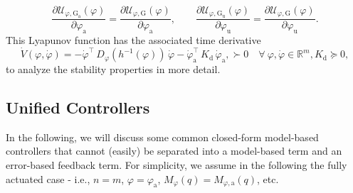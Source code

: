 \begin{equation}
    \frac{\partial \mathcal{U}_{\varphi,\mathrm{G}_\mathrm{a}}(\varphi)}{\partial \varphi_\mathrm{a}} = \frac{\partial \mathcal{U}_{\varphi,\mathrm{G}}(\varphi)}{\partial \varphi_\mathrm{a}},
    \qquad
    \frac{\partial \mathcal{U}_{\varphi,\mathrm{G}_\mathrm{u}}(\varphi)}{\partial \varphi_\mathrm{u}} = \frac{\partial \mathcal{U}_{\varphi,\mathrm{G}}(\varphi)}{\partial \varphi_\mathrm{u}}.
\end{equation}
This Lyapunov function has the associated time derivative
\begin{equation}
    \dot{V}(\varphi,\dot{\varphi}) = -\dot{\varphi}^\top \, D_\varphi(h^{-1}(\varphi)) \, \dot{\varphi} - \dot{\varphi}_\mathrm{a}^\top \, K_\mathrm{d} \, \dot{\varphi}_\mathrm{a}, \succ 0 \quad \forall \: \varphi,\dot{\varphi} \in \mathbb{R}^{m}, K_\mathrm{d} \succeq 0,
\end{equation}
to analyze the stability properties in more detail.

\subsection{Unified Controllers}\label{sub:background:model_based_control:unified_controllers}
In the following, we will discuss some common closed-form model-based controllers that cannot (easily) be separated into a model-based term and an error-based feedback term.
For simplicity, we assume in the following the fully actuated case - i.e., $n=m$, $\varphi = \varphi_\mathrm{a}$, $M_{\varphi}(q) = M_{\varphi,\mathrm{a}}(q)$, etc.

